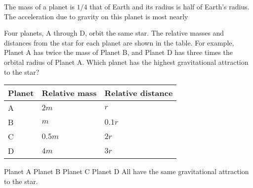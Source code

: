 \documentclass{../../oss-apphys-exam}
\begin{document}
\begin{multicols*}{2}
\begin{questions}
    \question The mass of a planet is $1/4$ that of Earth and its radius is
    half of Earth's radius. The acceleration due to gravity on this planet is
    most nearly
    

    \columnbreak
    \question Four planets, A through D, orbit the same star. The relative
    masses and distances from the star for each planet are shown in the table.
    For example, Planet A has twice the mass of Planet B, and Planet D has
    three times the orbital radius of Planet A. Which planet has the highest
    gravitational attraction to the star?
    \begin{center}
      \vspace{-.1in}
      \begin{tabular}{lll}
        \hline
        \textbf{Planet} & \textbf{Relative mass} & \textbf{Relative distance}\\
        \hline
        A\hspace{.4in}& $2m$     & $r$    \\ \hline
        B & $m$                  & $0.1r$\hspace{.25in} \\ \hline
        C & $0.5m$\hspace{.25in} & $2r$   \\ \hline
        D & $4m$                 & $3r$   \\ \hline
      \end{tabular}
    \end{center}
    \begin{choices}
      \choice Planet A
      \choice Planet B
      \choice Planet C
      \choice Planet D
      \choice All have the same gravitational attraction to the star.
    \end{choices}
    

\end{questions}
\end{multicols*}
\end{document}
